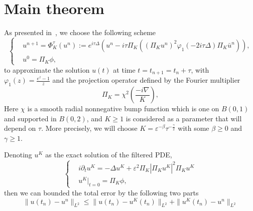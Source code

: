 \documentclass[10pt,a4paper]{article}
\begin{document}
  \section{Main theorem}
  As presented in~\cite{OsRoSc21}, we choose the following scheme
  \begin{equation}\label{num-sol} %
    \left\{
    \begin{aligned}
      & u^{n+1} = \Phi_K^{\tau}(u^n) := e^{i\tau\Delta} \left( u^n - i\tau\Pi_K
      \left( {(\Pi_K u^n)}^2 \varphi_1(-2i\tau\Delta)\Pi_K \bar{u}^n \right) \right), \\
      & u^0 = \Pi_K \phi,
    \end{aligned}
    \right.
  \end{equation}
  to approximate the solution \(u(t)\) at time \( t = t_{n+1} = t_n + \tau \),
  with \( \varphi_1(z) = \frac{e^z-1}{z} \) and the projection operator defined
  by the Fourier multiplier
  \begin{equation}
    \Pi_K = \chi^2 \left( \frac{-i\nabla}{K} \right),
  \end{equation}
  Here \(\chi\) is a smooth radial nonnegative bump function which is one on \(
  B(0,1) \) and supported in \( B(0,2) \), and \( K \geq 1 \) is considered as a
  parameter that will depend on \(\tau\). More precisely, we will choose \( K =
  \varepsilon^{-\beta}\tau^{-\frac\gamma2} \) with some \(\beta \geq 0\) and 
  \(\gamma \geq 1\).  

  Denoting \(u^K\) as the exact solution of the filtered PDE,
  \begin{equation}\label{nls-fil} %
    \left\{
    \begin{aligned}
      & i\partial_t u^K = -\Delta u^K + \varepsilon^2 \Pi_K|\Pi_K u^K|^2 \Pi_K u^K \\
      & u^K|_{t=0} = \Pi_K\phi,
    \end{aligned}
    \right.
  \end{equation}
  then we can bounded the total error by the following two parts
  \begin{equation}%
    \| u(t_n) - u^n \|_{L^2} \leq \| u(t_n) - u^K(t_n) \|_{L^2} + 
    \| u^K(t_n) - u^n \|_{L^2}
  \end{equation}
  
\end{document}
